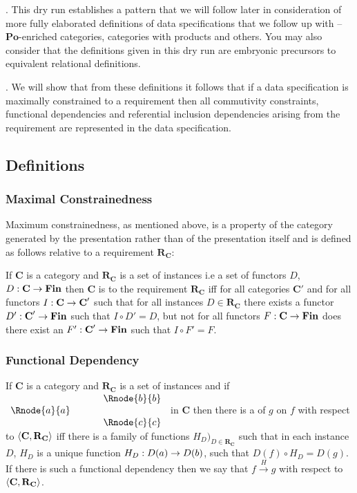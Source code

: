 \documentclass[10pt,a4paper]{article}
\theoremstyle{remark}
\newcommand{\catc}[1][C]{\textbf{#1}}
\newcommand{\catcp}[1][C]{\textbf{#1}'}
\newcommand{\reqt}{\textbf{R}}
\newcommand{\reqtc}[1][\catc]{\reqt_{#1}}
\newcommand{\Fin}{\ensuremath{\textbf{Fin}} }
\newcommand{\Po}{\ensuremath{\textbf{Po}} }
\newcommand{\fundep}[3]{#2 \xrightarrow{#1} #3}
\newlength{\oldparindent}
\newcommand{\ind}{\hspace*{\oldparindent}}
\newcounter{para}
\newcommand\note{\par\ind\refstepcounter{para}\thepara.\space}
\begin{document}
\note 
This dry run establishes a pattern that we will follow later in consideration of more fully elaborated 
definitions of 
data specifications that we follow up with -- $\Po$-enriched categories, categories with products and others. 
You may also consider that the definitions given in this dry run are embryonic precursors to equivalent relational definitions.

\note
We will show that from these definitions it follows that if a data specification is maximally constrained to a
requirement then  all commutivity constraints,  functional dependencies and referential inclusion dependencies arising from the requirement are represented in the data specification.

\subsection {Definitions}
\subsubsection{Maximal Constrainedness}
Maximum constrainedness, as mentioned above, is a property of the category generated by the presentation  rather than of the presentation itself and is defined as follows relative to a requirement $\reqtc$:

\begin{definition}
If $\catc$ is a category and $\reqtc$ is a set of instances i.e a set of functors $D$, $D: \catc \morph \Fin$ then $\catc$ is 
 to the requirement $\reqtc$ iff for all categories $\catcp$ and for all functors 
$I:\catc \morph \catcp$ such that for all instances $D \in \reqtc$ there exists a functor $D':\catcp \morph \Fin$
such that $I \circ D'=D$, but not for all functors $F: \catc \morph \Fin$ 
does there exist an $F' : \catcp \morph \Fin$ such that $I \circ F'=F$.
\end{definition}

\subsubsection{Functional Dependency}
\begin{definition}
If $\catc$ is a category and $\reqtc$ is a set of instances and if
$
\begin{array}{c p{0.5cm} c  }
             &&   \Rnode{b}{b} \\[0.01cm]
\Rnode{a}{a} &&                \\[0.01cm] 
             &&   \Rnode{c}{c}         
\end{array} 
$
in $\catc$ then there is a   of $g$ on $f$ with respect to $\tuple{\catc,\reqtc}$ iff
there is a family of functions $H_D)_{D \in \reqtc}$ such that 
in each instance $D$, $H_D$ is a unique function $H_D: D(a) \rightarrow D(b)$, such that $D(f) \circ H_D = D(g)$. 
If there is such a functional dependency then we say that $\fundep{H}{f}{g}$ with respect to $\tuple{\catc,\reqtc}$.
\end{definition}
\end{document}
